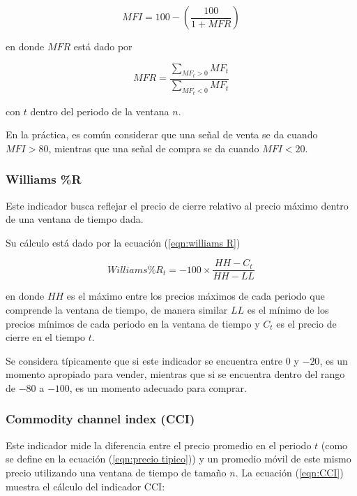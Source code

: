 \documentclass[12pt]{scrbook}
\theoremstyle{break}
\theoremstyle{break}
\begin{document}
\begin{equation} \label{eqn:MFI}
MFI = 100 - \left( \frac{100}{1 + MFR} \right)
\end{equation}

en donde $MFR$ está dado por 

\begin{equation} \label{eqn:MFR}
MFR = \dfrac{\sum_{MF_t > 0} MF_t  }{\sum_{MF_t < 0} MF_t}
\end{equation}

con $t$ dentro del periodo de la ventana $n$.

En la práctica, es común considerar que una señal de venta se da cuando $MFI > 80$, mientras que una señal de compra se da cuando $MFI < 20$.

\subsubsection{Williams \%R}
\label{subsubseccion:Williams R}
Este indicador busca reflejar el precio de cierre relativo al precio máximo dentro de una ventana de tiempo dada.

Su cálculo está dado por la ecuación (\ref{eqn:williams R})

\begin{equation} \label{eqn:williams R}
Williams \%R_t = -100 \times \dfrac{HH - C_t}{HH - LL}
\end{equation}

en donde $HH$ es el máximo entre los precios máximos de cada periodo que comprende la ventana de tiempo, de manera similar $LL$ es el mínimo de los precios mínimos de cada periodo en la ventana de tiempo y $C_t$ es el precio de cierre en el tiempo $t$.

Se considera típicamente que si este indicador se encuentra entre $0$ y $-20$, es un momento apropiado para vender, mientras que si se encuentra dentro del rango de $-80$ a $-100$, es un momento adecuado para comprar.

\subsubsection{Commodity channel index (CCI)}
\label{subsubseccion:cci}
Este indicador mide la diferencia entre el precio promedio en el periodo $t$ (como se define en la ecuación (\ref{eqn:precio tipico})) y un promedio móvil de este mismo precio utilizando una ventana de tiempo de tamaño $n$. La ecuación (\ref{eqn:CCI}) muestra el cálculo del indicador CCI:
\end{document}
